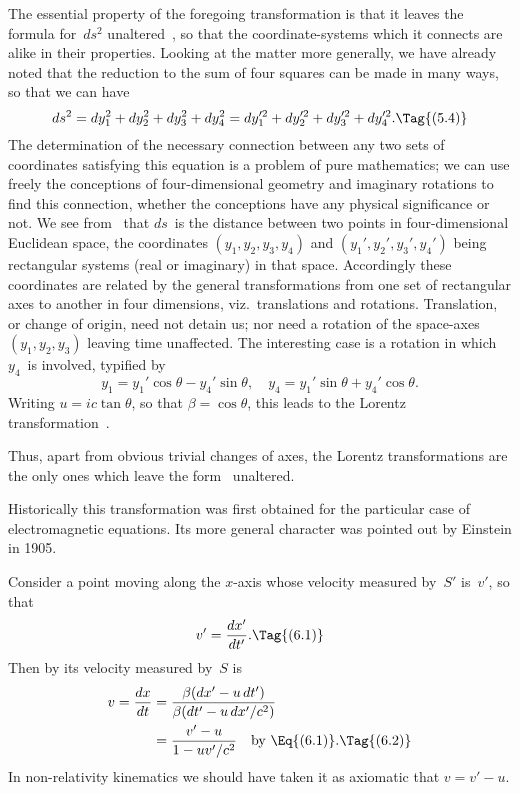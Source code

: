 \documentclass[12pt]{book}
\begin{document}
The essential property of the foregoing transformation is that it leaves
the formula for~$ds^{2}$ unaltered~, so that the coordinate-systems which it
connects are alike in their properties. Looking at the matter more generally,
we have already noted that the reduction to the sum of four squares can be
made in many ways, so that we can have
\[
ds^{2} = dy_{1}^{2} + dy_{2}^{2} + dy_{3}^{2} + dy_{4}^{2}
= dy_{1}'^{2} + dy_{2}'^{2} + dy_{3}'^{2} + dy_{4}'^{2}.
\Tag{(5.4)}
\]
The determination of the necessary connection between any two sets of
coordinates satisfying this equation is a problem of pure mathematics; we
can use freely the conceptions of four-dimensional geometry and imaginary
rotations to find this connection, whether the conceptions have any physical
significance or not. We see from~ that $ds$~is the distance between two
points in four-dimensional Euclidean space, the coordinates $(y_{1}, y_{2}, y_{3}, y_{4})$ and
$(y_{1}', y_{2}', y_{3}', y_{4}')$ being rectangular systems (real or imaginary) in that space.
Accordingly these coordinates are related by the general transformations from
one set of rectangular axes to another in four dimensions, viz.\ translations
and rotations. Translation, or change of origin, need not detain us; nor need
a rotation of the space-axes $(y_{1}, y_{2}, y_{3})$ leaving time unaffected. The interesting
case is a rotation in which $y_{4}$~is involved, typified by
\[
y_{1} = y_{1}' \cos\theta - y_{4}' \sin\theta,\quad
y_{4} = y_{1}' \sin\theta + y_{4}' \cos\theta.
\]
Writing $u = ic \tan\theta$, so that $\beta = \cos\theta$, this leads to the Lorentz transformation~.

Thus, apart from obvious trivial changes of axes, the Lorentz transformations
are the only ones which leave the form~ unaltered.

Historically this transformation was first obtained for the particular case
of electromagnetic equations. Its more general character was pointed out by
Einstein in 1905.

%

Consider a point moving along the $x$-axis whose velocity measured by~$S'$
is~$v'$, so that
\[
v' = \frac{dx'}{dt'}.
\Tag{(6.1)}
\]
Then by  its velocity measured by~$S$ is
\begin{align*}
  v = \frac{dx}{dt}
  &= \frac{\beta(dx' - u\, dt')}{\beta(dt' - u\, dx'/c^{2})} \\
  &= \frac{v' - u}{1 - u v'/c^{2}}\quad\text{by \Eq{(6.1)}.}
  \Tag{(6.2)}
\end{align*}
In non-relativity kinematics we should have taken it as axiomatic that
$v = v' - u$.
\end{document}
